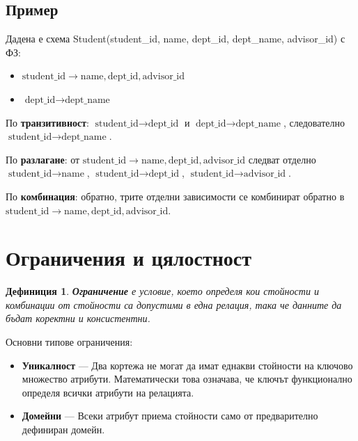 \documentclass{scrartcl}
\newtheorem{definition}{Дефиниция}
\begin{document}
\begin{FlushLeft}
\subsection{Пример}

Дадена е схема Student(student\_id, name, dept\_id, dept\_name, advisor\_id) с ФЗ:
\begin{itemize}
    \item $\text{student\_id} \rightarrow \text{name}, \text{dept\_id}, \text{advisor\_id}$
    \item $\text{dept\_id} \rightarrow \text{dept\_name}$
\end{itemize}

По \textbf{транзитивност}: $\text{student\_id} \rightarrow \text{dept\_id}$ и $\text{dept\_id} \rightarrow \text{dept\_name}$, следователно $\text{student\_id} \rightarrow \text{dept\_name}$.

По \textbf{разлагане}: от $\text{student\_id} \rightarrow \text{name}, \text{dept\_id}, \text{advisor\_id}$ следват отделно $\text{student\_id} \rightarrow \text{name}$, $\text{student\_id} \rightarrow \text{dept\_id}$, $\text{student\_id} \rightarrow \text{advisor\_id}$.

По \textbf{комбинация}: обратно, трите отделни зависимости се комбинират обратно в $\text{student\_id} \rightarrow \text{name}, \text{dept\_id}, \text{advisor\_id}$.

\section{Ограничения и цялостност}

\begin{definition}
\textbf{\textit{Ограничение}} е условие, което определя кои стойности и комбинации от стойности са допустими в една релация, така че данните да бъдат коректни и консистентни.
\end{definition}

Основни типове ограничения:

\begin{itemize}
    \item \textbf{Уникалност} --- Два кортежа не могат да имат еднакви стойности на ключово множество атрибути. Математически това означава, че ключът функционално определя всички атрибути на релацията.
    
    \item \textbf{Домейни} --- Всеки атрибут приема стойности само от предварително дефиниран домейн.
    

\end{itemize}
\end{FlushLeft}
\end{document}
